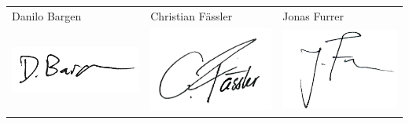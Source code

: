 \begin{tabular}{lll}
	Danilo Bargen & Christian Fässler & Jonas Furrer \\
\includegraphics[scale=0.7]{images/unterschrift-danilo} & \includegraphics[scale=0.7]{images/unterschrift-chrigi} & \includegraphics[scale=0.7]{images/unterschrift-jonas} \\
\end{tabular} 